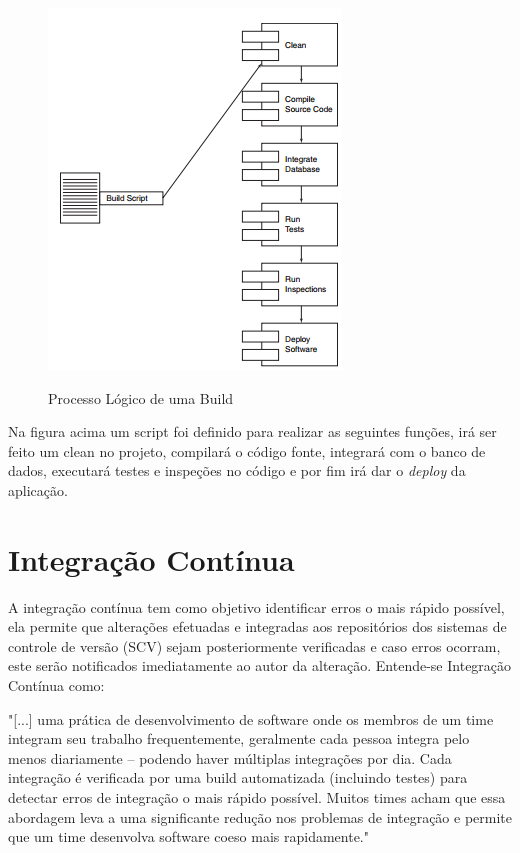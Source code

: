 \begin{figure}[h]
\centering
\caption[Processo Lógico de uma Build]{Processo Lógico de uma Build}
\includegraphics[width=0.5\linewidth]{./images/build}
\label{fig:build}
\end{figure}
Na figura acima um script foi definido para realizar as seguintes funções, irá ser feito um clean no projeto, compilará o código fonte, integrará com o banco de dados, executará testes e inspeções no código e por fim irá dar o \textit{deploy} da aplicação.



\section{Integração Contínua}\label{integracaocont}

A integração contínua tem como objetivo identificar erros o mais rápido possível, ela permite que alterações efetuadas e integradas aos repositórios dos sistemas de controle de versão (SCV) sejam posteriormente verificadas e caso erros ocorram, este serão notificados imediatamente ao autor da alteração.
Entende-se Integração Contínua como:
\begin{citacao}
"[...] uma prática de desenvolvimento de software onde os membros de um time integram seu trabalho frequentemente, geralmente cada pessoa integra pelo menos diariamente – podendo haver múltiplas integrações por dia. Cada integração é verificada por uma build automatizada (incluindo testes) para detectar erros de integração o mais rápido possível. Muitos times acham que essa abordagem leva a uma significante redução nos problemas de integração e permite que um time desenvolva software coeso mais rapidamente." 
\end{citacao}

